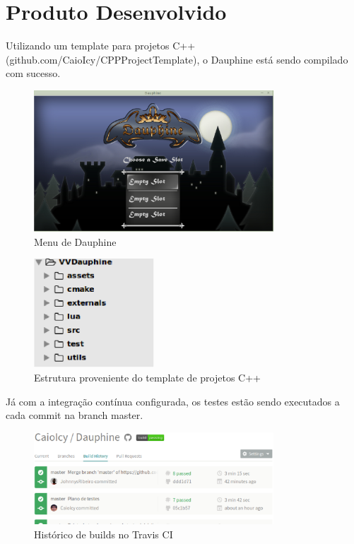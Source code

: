 \chapter[Produto Desenvolvido]{Produto Desenvolvido}

Utilizando um template para projetos C++ (github.com/CaioIcy/CPP\textunderscore Project\textunderscore Template), o Dauphine
está sendo compilado com sucesso.

\begin{figure}[h]
	\centering
	\includegraphics[width=0.8\textwidth]{figuras/vv_dauphine.eps}
	\caption{Menu de Dauphine}
	\label{img:dauphine}
\end{figure}

\begin{figure}[h]
	\centering
	\includegraphics[width=0.4\textwidth]{figuras/vv_cp3t.eps}
	\caption{Estrutura proveniente do template de projetos C++}
	\label{img:cp3t}
\end{figure}

Já com a integração contínua configurada, os testes estão sendo executados a cada commit na branch master.

\begin{figure}[h]
	\centering
	\includegraphics[width=0.8\textwidth]{figuras/vv_travis.eps}
	\caption{Histórico de builds no Travis CI}
	\label{img:travis}
\end{figure}

